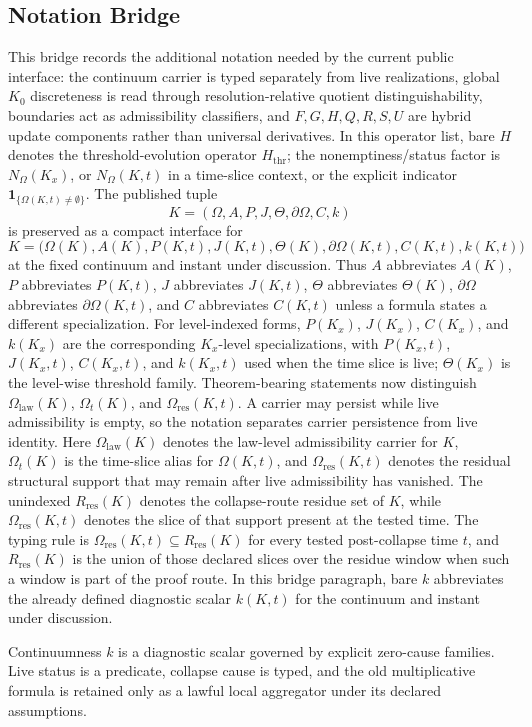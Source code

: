 \endgroup


\subsection{Notation Bridge}
\label{sec:oc133-notation-scientific-closure-bridge}

This bridge records the additional notation needed by the current public
interface: the continuum carrier is typed separately from live realizations,
global \(K_0\) discreteness is read through resolution-relative quotient
distinguishability, boundaries act as admissibility classifiers, and
\(F,G,H,Q,R,S,U\) are hybrid update components rather than universal
derivatives.  In this operator list, bare \(H\) denotes the threshold-evolution
operator \(H_{\mathrm{thr}}\); the nonemptiness/status factor is
\(N_{\Omega}(K_x)\), or \(N_{\Omega}(K,t)\) in a time-slice context, or the explicit indicator
\(\mathbf{1}_{\{\Omega(K,t)\neq\emptyset\}}\).  The published tuple
\[
K=(\Omega,A,P,J,\Theta,\partial\Omega,C,k)
\]
is preserved as a compact interface for
\[
K=\big(\Omega(K),A(K),P(K,t),J(K,t),\Theta(K),
       \partial\Omega(K,t),C(K,t),k(K,t)\big)
\]
at the fixed continuum and instant under discussion.  Thus \(A\) abbreviates
\(A(K)\), \(P\) abbreviates \(P(K,t)\), \(J\) abbreviates \(J(K,t)\),
\(\Theta\) abbreviates \(\Theta(K)\), \(\partial\Omega\) abbreviates
\(\partial\Omega(K,t)\), and \(C\) abbreviates \(C(K,t)\) unless a formula
states a different specialization. For level-indexed forms, \(P(K_x)\),
\(J(K_x)\), \(C(K_x)\), and \(k(K_x)\) are the corresponding \(K_x\)-level
specializations, with \(P(K_x,t)\), \(J(K_x,t)\), \(C(K_x,t)\), and
\(k(K_x,t)\) used when the time slice is live; \(\Theta(K_x)\) is the
level-wise threshold family. Theorem-bearing statements now distinguish
\(\Omega_{\mathrm{law}}(K)\), \(\Omega_t(K)\), and
\(\Omega_{\mathrm{res}}(K,t)\).  A carrier may persist while live admissibility
is empty, so the notation separates carrier persistence from live identity.
Here \(\Omega_{\mathrm{law}}(K)\) denotes the law-level admissibility carrier
for \(K\), \(\Omega_t(K)\) is the time-slice alias for \(\Omega(K,t)\), and
\(\Omega_{\mathrm{res}}(K,t)\) denotes the residual structural support that may
remain after live admissibility has vanished. The unindexed
\(R_{\mathrm{res}}(K)\) denotes the collapse-route residue set of \(K\), while
\(\Omega_{\mathrm{res}}(K,t)\) denotes the slice of that support present at
the tested time. The typing rule is
\(\Omega_{\mathrm{res}}(K,t)\subseteq R_{\mathrm{res}}(K)\) for every tested
post-collapse time \(t\), and \(R_{\mathrm{res}}(K)\) is the union of those
declared slices over the residue window when such a window is part of the
proof route. In this bridge paragraph, bare
\(k\) abbreviates the already defined diagnostic scalar \(k(K,t)\) for the
continuum and instant under discussion.

Continuumness \(k\) is a diagnostic scalar governed by explicit zero-cause
families.  Live status is a predicate, collapse cause is typed, and the old
multiplicative formula is retained only as a lawful local aggregator under its
declared assumptions.

